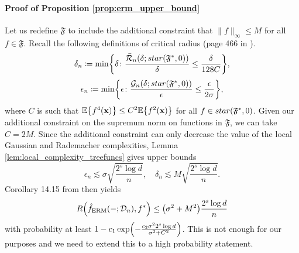 \documentclass[11pt]{article}
\newcommand{\bx}{\mathbf{x}}
\DeclarePairedDelimiter{\braces}{\lbrace}{\rbrace}
\DeclarePairedDelimiter{\paren}{(}{)}
\newcommand{\E}{\mathbb{E}}
\newcommand{\cell}{\mathcal{C}}
\newcommand{\partition}{\mathcal{P}}
\newcommand{\data}[1][n]{\mathcal{D}_{#1}}
\newcommand{\funcclass}{\mathfrak{F}}
\newcommand{\ferm}{\hat{f}_{\operatorname{ERM}}}
\begin{document}


\paragraph{Proof of Proposition \ref{prop:erm_upper_bound}}
Let us redefine $\funcclass$ to include the additional constraint that $\|f\|_\infty \leq M$ for all $f \in \funcclass$.
Recall the following definitions of critical radius (page 466 in \cite{wainwright2019high}).
\begin{equation}
    \delta_n \coloneqq \min \braces*{\delta \colon \frac{\bar{\mathcal{R}}_n(\delta;\textnormal{star}(\funcclass^*,0))}{\delta} \leq \frac{\delta}{128C}},
\end{equation}
\begin{equation}
    \epsilon_n \coloneqq \min \braces*{\epsilon \colon \frac{\mathcal{G}_n(\delta;\textnormal{star}(\funcclass^*,0))}{\epsilon} \leq \frac{\epsilon}{2\sigma}}, 
\end{equation}
where $C$ is such that $\E\braces*{f^4(\bx)} \leq C^2\E\braces*{f^2(\bx)}$ for all $f \in \textnormal{star}(\funcclass^*,0)$.
Given our additional constraint on the supremum norm on functions in $\funcclass$, we can take $C = 2M$.
Since the additional constraint can only decrease the value of the local Gaussian and Rademacher complexities, Lemma \ref{lem:local_complexity_treefuncs} gives upper bounds
\begin{equation}
    \epsilon_n \lesssim \sigma\sqrt{\frac{2^s\log d}{n}}, \quad \delta_n \lesssim M\sqrt{\frac{2^s\log d}{n}}.
\end{equation}
Corollary 14.15 from \cite{wainwright2019high} then yields
\begin{equation}
    R\paren*{\ferm(-;\data), f^*} \leq \paren*{\sigma^2 + M^2}\frac{2^s\log d}{n}
\end{equation}
with probability at least $1 - c_1\exp\paren*{-\frac{c_2\sigma^22^s\log d}{\sigma^2 + C^2}}$.
This is not enough for our purposes and we need to extend this to a high probability statement.
\end{document}
